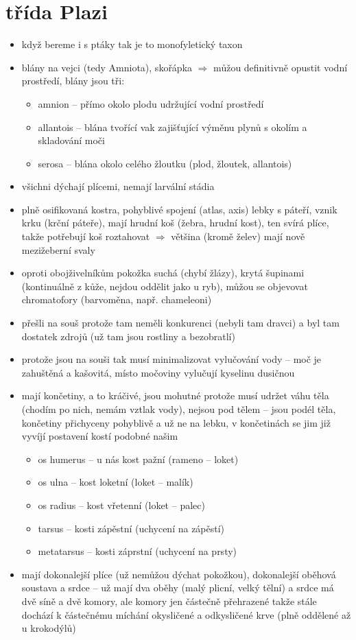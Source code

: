 \documentclass{article}
\begin{document}
\section{třída Plazi}
\begin{itemize}
  \item když bereme i s ptáky tak je to monofyletický taxon
  \item blány na vejci (tedy Amniota), skořápka $\Rightarrow$ můžou definitivně opustit vodní prostředí, blány jsou tři:
  \begin{itemize}
    \item amnion -- přímo okolo plodu udržující vodní prostředí
    \item allantois -- blána tvořící vak zajišťující výměnu plynů s okolím a skladování moči
    \item serosa -- blána okolo celého žloutku (plod, žloutek, allantois)
  \end{itemize}
  \item všichni dýchají plícemi, nemají larvální stádia
  \item plně osifikovaná kostra, pohyblivé spojení (atlas, axis) lebky s páteří, vznik krku (krční páteře), mají hrudní koš (žebra, hrudní kost), ten svírá plíce, takže potřebují koš roztahovat $\Rightarrow$ většina (kromě želev) mají nově mezižeberní svaly
  \item oproti obojživelníkům pokožka suchá (chybí žlázy), krytá šupinami (kontinuálně z kůže, nejdou oddělit jako u ryb), můžou se objevovat chromatofory (barvoměna, např. chameleoni)
  \item přešli na souš protože tam neměli konkurenci (nebyli tam dravci) a byl tam dostatek zdrojů (už tam jsou rostliny a bezobratlí)
  \item protože jsou na souši tak musí minimalizovat vylučování vody -- moč je zahuštěná a kašovitá, místo močoviny vylučují kyselinu dusičnou
  \item mají končetiny, a to kráčivé, jsou mohutné protože musí udržet váhu těla (chodím po nich, nemám vztlak vody), nejsou pod tělem -- jsou podél těla, končetiny přichyceny pohyblivě a už ne na lebku, v končetinách se jim již vyvíjí postavení kostí podobné našim
  \begin{itemize}
    \item os humerus -- u nás kost pažní (rameno -- loket)
    \item os ulna -- kost loketní (loket -- malík)
    \item os radius -- kost vřetenní (loket -- palec)
    \item tarsus -- kosti zápěstní (uchycení na zápěstí)
    \item metatarsus -- kosti záprstní (uchycení na prsty)
  \end{itemize}
  \item mají dokonalejší plíce (už nemůžou dýchat pokožkou), dokonalejší oběhová soustava a srdce -- už mají dva oběhy (malý plicní, velký tělní) a srdce má dvě síně a dvě komory, ale komory jen částečně přehrazené takže stále dochází k částečnému míchání okysličené a odkysličené krve (plně oddělené až u krokodýlů)
\end{itemize}
\end{document}
